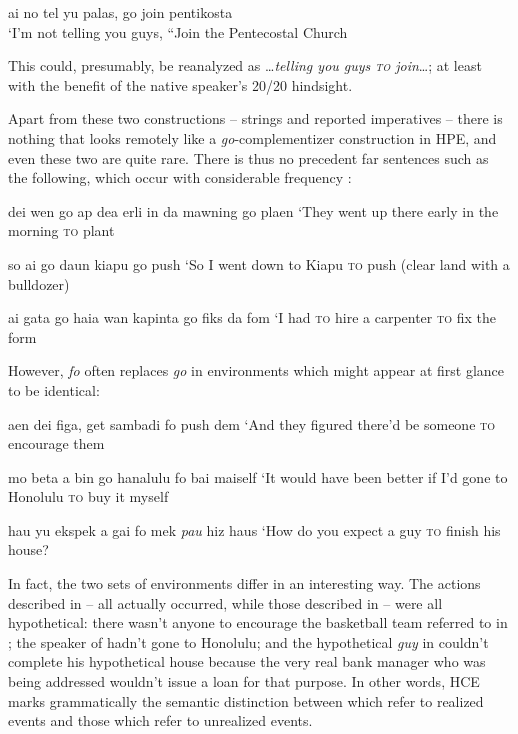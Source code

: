 \ea\label{ex:60}
 ai no tel yu palas, go join pentikosta\\
\glt `I'm not telling you guys, ``Join the Pentecostal Church 
\z

\noindent This could, presumably, be reanalyzed as \ldots \textit{telling you guys \textsc{to} join}\ldots; at least with the benefit of the native  speaker's 20/20 hindsight.

Apart from these two constructions --  strings and reported imperatives -- there is nothing that looks remotely like a \textit{go}-complementizer construction in HPE, and even these two are quite rare. There is thus no precedent far sentences such as the following, which occur with considerable frequency :

\ea\label{ex:61}
 dei wen go ap dea erli in da mawning go plaen
\glt `They went up there early in the morning \textsc{to} plant
\z

\ea\label{ex:62}
 so ai go daun kiapu go push
\glt `So I went down to Kiapu \textsc{to} push (clear land with a bulldozer)
\z

\ea\label{ex:63}
 ai gata go haia wan kapinta go fiks da fom
\glt `I had \textsc{to} hire a carpenter \textsc{to} fix the form
\z

However, \textit{fo} often replaces \textit{go} in environments which might appear at first glance to be identical:

\ea\label{ex:64}
 aen dei figa, get sambadi fo push dem
\glt `And they figured there'd be someone \textsc{to} encourage them
\z

\ea\label{ex:65}
 mo beta a bin go hanalulu fo bai maiself
\glt `It would have been better if I'd gone to Honolulu \textsc{to} buy it myself 
\z

\ea\label{ex:66}
 hau yu ekspek a gai fo mek \textit{pau} hiz haus
\glt `How do you expect a guy \textsc{to} finish his house?
\z

\noindent In fact, the two sets of environments differ in an interesting way. The actions described in -- all actually occurred, while those de\-scribed in -- were all hypothetical: there wasn't anyone to encourage the basketball team referred to in ; the speaker of  hadn't gone to Honolulu; and the hypothetical \textit{guy} in  couldn't complete his hypothetical house because the very real bank manager who was being addressed wouldn't issue a loan for that purpose. In
other words, HCE marks grammatically the semantic distinction be\-tween   which refer to realized events and those which refer to unrealized events.


